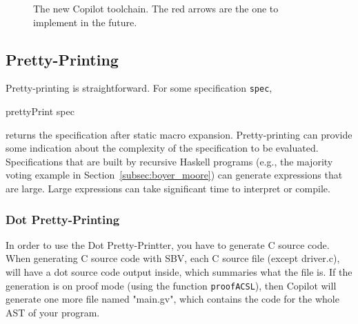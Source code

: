\begin{figure}[ht!]
	\caption{The new Copilot toolchain. The red arrows are the one to implement in the future.}
	\label{fig:new-toolchain}
	\end{figure}

\subsection{Pretty-Printing} \label{sec:pretty-printing}
Pretty-printing is straightforward. For some specification {\tt spec},
%
\begin{code}
prettyPrint spec
\end{code}
%
\noindent
returns the specification after static macro expansion. Pretty-printing can
provide some indication about the complexity of the specification to be
evaluated. Specifications that are built by recursive Haskell programs (e.g.,
the majority voting example in Section~\ref{subsec:boyer_moore}) can generate
expressions that are large. Large expressions can take significant
time to interpret or compile. 

\subsubsection{Dot Pretty-Printing} 

In order to use the Dot Pretty-Printter, you have to generate C source code. When generating C source code with SBV, each C source file (except driver.c), will have a dot source code output inside, which summaries what the file is. If the generation is on proof mode (using the function \texttt{proofACSL}), then Copilot will generate one more file named "main.gv", which contains the code for the whole AST of your program. 

